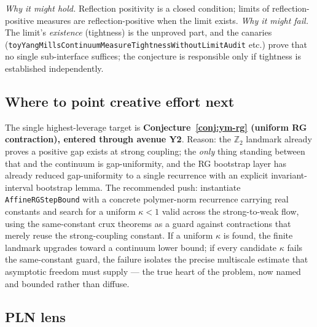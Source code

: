 \noindent\emph{Why it might hold.} Reflection positivity is a closed condition;
limits of reflection-positive measures are reflection-positive when the limit
exists. \emph{Why it might fail.} The limit's \emph{existence} (tightness) is the
unproved part, and the canaries
(\verb|toyYangMillsContinuumMeasureTightnessWithoutLimitAudit| etc.) prove that
no single sub-interface suffices; the conjecture is responsible only if tightness
is established independently.

\subsection{Where to point creative effort next}

The single highest-leverage target is
\textbf{Conjecture~\ref{conj:ym-rg} (uniform RG contraction), entered through
avenue Y2}. Reason: the $\mathbb{Z}_2$ landmark already proves a positive gap
exists at strong coupling; the \emph{only} thing standing between that and the
continuum is gap-uniformity, and the RG bootstrap layer has already reduced
gap-uniformity to a single recurrence with an explicit invariant-interval
bootstrap lemma. The recommended push: instantiate
\verb|AffineRGStepBound| with a concrete polymer-norm recurrence carrying real
constants and search for a uniform $\kappa<1$ valid across the strong-to-weak
flow, using the same-constant crux theorems as a guard against contractions that
merely reuse the strong-coupling constant. If a uniform $\kappa$ is found, the
finite landmark upgrades toward a continuum lower bound; if every candidate
$\kappa$ fails the same-constant guard, the failure isolates the precise
multiscale estimate that asymptotic freedom must supply --- the true heart of the
problem, now named and bounded rather than diffuse.

\subsection*{PLN lens}


